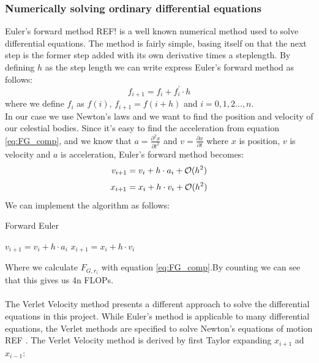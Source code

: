 \documentclass{article}
\newcommand{\husk}[1]{\color{red} #1 \color{black}}
\begin{document}
\subsubsection{Numerically solving ordinary differential equations}
Euler's forward method \husk{REF!} is a well known numerical method used to solve differential equations. The method is fairly simple, basing itself on that the next step is the former step added with its own derivative times a steplength. By defining $h$ as the step length we can write express Euler's forward method as follows:
\begin{equation}
f_{i + 1} = f_i + f^{'}_i \cdot h
\label{eq:fwdEuler}
\end{equation}
where we define $f_i$ as $f(i)$, $f_{i+1} = f(i + h)$ and $i = 0, 1, 2 ... , n$. \\
In our case we use Newton's laws and we want to find the position and velocity of our celestial bodies. Since it's easy to find the acceleration from equation \eqref{eq:FG_comp}, and we know that $a = \frac{\partial^2 x}{\partial t^2}$ and $v = \frac{\partial x}{\partial t}$ where $x$ is position, $v$ is velocity and $a$ is acceleration, Euler's forward method becomes:
\begin{equation}
v_{i + 1} = v_i + h \cdot a_i + \mathcal{O}(h^2)\\
\label{eq:Eulervel}
\end{equation}
\begin{equation}
x_{i + 1} = x_i + h \cdot v_i + \mathcal{O}(h^2)\\
\label{eq:Eulerpos}
\end{equation}
We can implement the algorithm as follows:
\begin{algorithm}[H]
\small
\caption{Forward Euler}\label{alg:VelVerlet}
\begin{algorithmic}[1]
\State $v_{i+1} = v_i + h\cdot a_i $
\State $x_{i+1} = x_i + h\cdot v_i $
\EndFor
\end{algorithmic}
\end{algorithm}
Where we calculate $F_{G, r_i}$ with equation \eqref{eq:FG_comp}.By counting we can see that this gives us 4n FLOPs. \\ \\
The Verlet Velocity method presents a different approach to solve the differential equations in this project. While Euler's method is applicable to many differential equations, the Verlet methods are specified to solve Newton's equations of motion \husk{REF}. The Verlet Velocity method is derived by first Taylor expanding $x_{i + 1}$ ad $x_{i-1}$:
\end{document}
